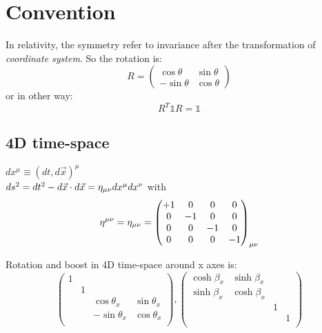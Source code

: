 \section{Convention}
In relativity, the symmetry refer to invariance after the transformation of
\emph{coordinate system}. So the rotation is:
\begin{equation}
    R = 
	\begin{pmatrix}
	    \cos\theta	& \sin\theta	\\
	    -\sin\theta	& \cos\theta
	\end{pmatrix}
\end{equation}
or in other way:
\[ R^{T}\mathds{1}R = \mathds{1} \]
    
\subsection{4D time-space}   
$dx^{\mu} \equiv (dt, d\vec{x})^{\mu}$ \\
$ ds^{2} = dt^{2} - d\vec{x}\cdot d\vec{x} =
\eta_{\mu\nu}dx^{\mu}dx^{\nu}$	with 
\begin{equation}
    \eta^{\mu\nu} = \eta_{\mu\nu} = 
    \begin{pmatrix}
	+1  & 0	  & 0  & 0	\\
	0   & -1  & 0  & 0	\\
	0   & 0	  & -1 & 0	\\
	0   & 0	  & 0  & -1
    \end{pmatrix}_{\mu\nu}
    \label{Minkowski metric}
\end{equation}
    
Rotation and boost in 4D time-space around x axes is:
\begin{equation*}
    \begin{pmatrix}
	1   &	&   &	\\
	    & 1 &   &	\\
	    &	& \cos\theta_x	& \sin\theta_x	\\
	    &	& -\sin\theta_x	& \cos\theta_x	\\
    \end{pmatrix},
    \begin{pmatrix}
	\cosh\beta_x	& \sinh\beta_x	&   &	\\
	\sinh\beta_x	& \cosh\beta_x	&   &	\\
	    &	& 1 &  	\\
	    &	&   & 1	\\
    \end{pmatrix}
\end{equation*}
    

